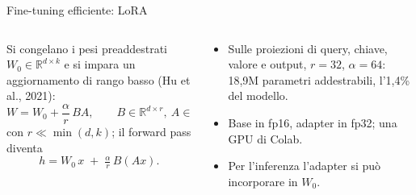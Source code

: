 \documentclass[aspectratio=169]{beamer}
\newcommand{\T}[2]{#2}
\newcommand{\T}[2]{#1}
\begin{document}
\begin{frame}{\T{Parameter-efficient fine-tuning: LoRA}{Fine-tuning efficiente: LoRA}}
  \begin{columns}[t]
    \begin{column}{0.58\textwidth}
      \small
      \T{Freeze the pretrained weights $W_0\in\mathbb R^{d\times k}$ and learn a low-rank update
      (Hu et al., 2021):}%
      {Si congelano i pesi preaddestrati $W_0\in\mathbb R^{d\times k}$ e si impara un
      aggiornamento di rango basso (Hu et al., 2021):}
      \[
        W = W_0 + \frac{\alpha}{r}\,B A,\qquad B\in\mathbb R^{d\times r},\ A\in\mathbb R^{r\times k},
      \]
      \T{with $r\ll\min(d,k)$; the forward pass is}{con $r\ll\min(d,k)$; il forward pass diventa}
      \[
        h = W_0\,x \;+\; \tfrac{\alpha}{r}\,B(Ax).
      \]
    \end{column}
    \begin{column}{0.42\textwidth}
      \small
      \begin{itemize}
        \item \T{On the query, key, value and output projections, $r{=}32$, $\alpha{=}64$:
              18.9M trainable parameters, 1.4\% of the model.}%
              {Sulle proiezioni di query, chiave, valore e output, $r{=}32$, $\alpha{=}64$:
              18,9M parametri addestrabili, l'1,4\% del modello.}
        \item \T{Base in fp16, adapter in fp32; one Colab GPU.}%
              {Base in fp16, adapter in fp32; una GPU di Colab.}
        \item \T{The adapter can be merged into $W_0$ at inference time.}%
              {Per l'inferenza l'adapter si pu\`o incorporare in $W_0$.}
      \end{itemize}
    \end{column}
  \end{columns}
\end{frame}
\end{document}
